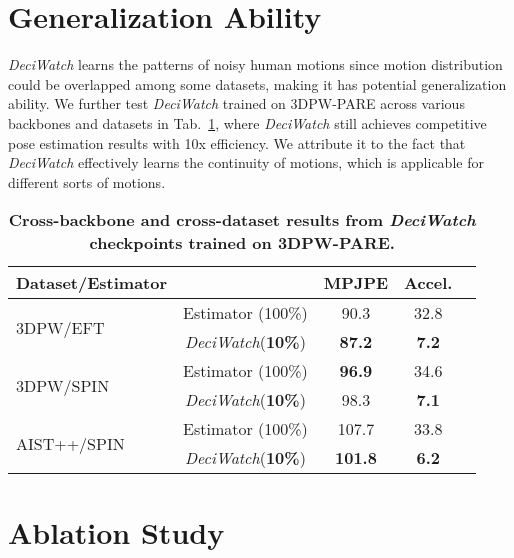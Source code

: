 \documentclass[runningheads]{llncs}
\newcommand{\name}{\emph{DeciWatch}\xspace}
\begin{document}
\section{Generalization Ability}
\label{sec:supp_general}
\name learns the patterns of noisy human motions since motion distribution could be overlapped among some datasets, making it has potential generalization ability. 
We further test \name trained on 3DPW-PARE across various backbones and datasets in Tab.~\ref{table:generalize}, where \name still achieves competitive pose estimation results with 10x efficiency. We attribute it to the fact that \name effectively learns the continuity of motions, which is applicable for different sorts of motions. 


\begin{table}[H]
	\centering
    \scriptsize
    \caption{\textbf{Cross-backbone and cross-dataset results from \name checkpoints trained on 3DPW-PARE.}}
	{
		\begin{tabular}{l|cccc}
		\midrule[0.25pt]
        Dataset/Estimator            &           & MPJPE & Accel.  \\
        \midrule[0.25pt]
        \multirow{2}{*}{3DPW/EFT}    & Estimator (100\%) & 90.3  & 32.8      \\
                                     &\name (\textbf{10\%})   & \textbf{87.2}{\color{Red}}  & \textbf{7.2}{\color{Red}}     \\
        \midrule[0.15pt]
        \multirow{2}{*}{3DPW/SPIN}   & Estimator (100\%) & \textbf{96.9}  & 34.6      \\
                                     & \name (\textbf{10\%})   & 98.3{\color{Blue}}  & \textbf{7.1}{\color{Red}}       \\
        \midrule[0.15pt]
        \multirow{2}{*}{AIST++/SPIN} & Estimator (100\%) & 107.7 & 33.8   \\
                                     & \name (\textbf{10\%})  & \textbf{101.8}{\color{Red}} & \textbf{6.2}{\color{Red}}   \\
        \midrule[0.25pt]
        \end{tabular}
	}

	\label{table:generalize}
\end{table}



\section{Ablation Study}
\label{sec:supp_ablation}
\end{document}
